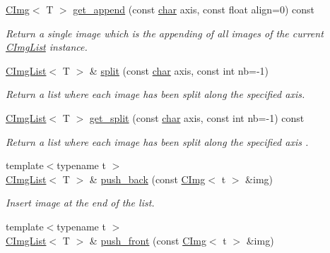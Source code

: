 \begin{Indent}
\begin{DoxyCompactItemize}
\hyperlink{structcimg__library__suffixed_1_1CImg}{C\+Img}$<$ T $>$ \hyperlink{structcimg__library__suffixed_1_1CImgList_a0742de5c028207997d91cd6599262ef9}{get\+\_\+append} (const \hyperlink{classchar}{char} axis, const float align=0) const
\begin{DoxyCompactList}\small\item\em Return a single image which is the appending of all images of the current \hyperlink{structcimg__library__suffixed_1_1CImgList}{C\+Img\+List} instance. \end{DoxyCompactList}\item 
\hyperlink{structcimg__library__suffixed_1_1CImgList}{C\+Img\+List}$<$ T $>$ \& \hyperlink{structcimg__library__suffixed_1_1CImgList_ab9744c8b1e41678f91de1dc4049aa058}{split} (const \hyperlink{classchar}{char} axis, const int nb=-\/1)
\begin{DoxyCompactList}\small\item\em Return a list where each image has been split along the specified axis. \end{DoxyCompactList}\item 
\mbox{\label{structcimg__library__suffixed_1_1CImgList_acd40eb1c5e564dbc31a65e149e094988}} 
\hyperlink{structcimg__library__suffixed_1_1CImgList}{C\+Img\+List}$<$ T $>$ \hyperlink{structcimg__library__suffixed_1_1CImgList_acd40eb1c5e564dbc31a65e149e094988}{get\+\_\+split} (const \hyperlink{classchar}{char} axis, const int nb=-\/1) const
\begin{DoxyCompactList}\small\item\em Return a list where each image has been split along the specified axis . \end{DoxyCompactList}\item 
{\footnotesize template$<$typename t $>$ }\\\hyperlink{structcimg__library__suffixed_1_1CImgList}{C\+Img\+List}$<$ T $>$ \& \hyperlink{structcimg__library__suffixed_1_1CImgList_ac84a1c643e314bf2aeb8267a44e9970d}{push\+\_\+back} (const \hyperlink{structcimg__library__suffixed_1_1CImg}{C\+Img}$<$ t $>$ \&img)
\begin{DoxyCompactList}\small\item\em Insert image at the end of the list. \end{DoxyCompactList}\item 
{\footnotesize template$<$typename t $>$ }\\\hyperlink{structcimg__library__suffixed_1_1CImgList}{C\+Img\+List}$<$ T $>$ \& \hyperlink{structcimg__library__suffixed_1_1CImgList_a7a8dcb1a1f3d1e6a8ef8537c63415933}{push\+\_\+front} (const \hyperlink{structcimg__library__suffixed_1_1CImg}{C\+Img}$<$ t $>$ \&img)

\end{DoxyCompactItemize}
\end{Indent}
